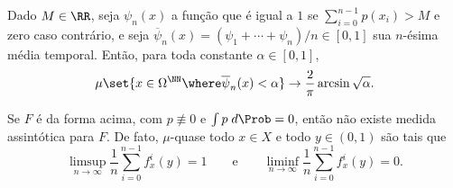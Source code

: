 \documentclass[../fapesp0]{subfiles}
\begin{document}
\begin{proposition}\label{prop:arcsine}
  Dado \(M \in \RR\), seja \(\psi_n(x)\) a função que é igual a \(1\) se \(\sum_{i = 0}^{n - 1}p(x_i) > M\) e zero caso contrário, e seja \(\overline{\psi}_n(x) = (\psi_1 + \cdots + \psi_n)/n \in [0,1]\) sua \(n\)-ésima média temporal. Então, para toda constante \(\alpha \in [0,1]\),
  \begin{equation*}
    \mu \set{x \in \Omega^{\NN} \where \overline{\psi}_n(x) < \alpha} \to \frac{2}{\pi}\arcsin \sqrt{\alpha}.
  \end{equation*}
\end{proposition}

\begin{theorem}
  Se \(F\) é da forma acima, com \(p \not\equiv 0\) e \(\int p \;d\Prob = 0\), então não existe medida assintótica para \(F\). De fato, \(\mu\)-quase todo \(x \in X\) e todo \(y \in (0,1)\) são tais que
  \begin{equation*}
    \limsup_{n \to \infty} \frac{1}{n} \sum_{i = 0}^{n - 1}f_x^i(y) = 1 \qquad \text{e}\qquad \liminf_{n \to \infty} \frac{1}{n}\sum_{i = 0}^{n - 1}f_x^i(y) = 0.
  \end{equation*}
\end{theorem}
\end{document}
